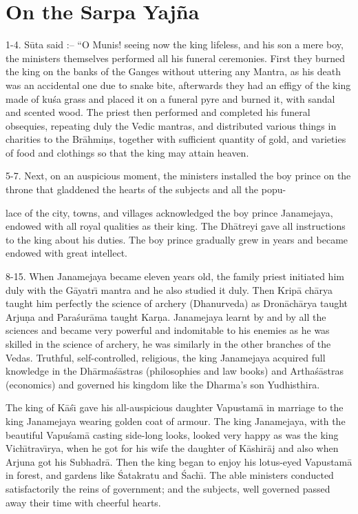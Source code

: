 \chapter{On the Sarpa Yaj\~na}

1-4. S\=uta said :-- ``O Munis! seeing now the king lifeless, and his son a mere boy, the ministers themselves performed all his funeral ceremonies. First they burned the king on the banks of the Ganges without uttering any Mantra, as his death was an accidental one due to snake bite, afterwards they had an effigy of the king made of ku\'sa grass and placed it on a funeral pyre and burned it, with sandal and scented wood. The priest then performed and completed his funeral obsequies, repeating duly the Vedic mantras, and distributed various things in charities to the Br\=ahmi\d{n}s, together with sufficient quantity of gold, and varieties of food and clothings so that the king may attain heaven.

5-7. Next, on an auspicious moment, the ministers installed the boy prince on the throne that gladdened the hearts of the subjects and all the popu-

lace of the city, towns, and villages acknowledged the boy prince Janamejaya, endowed with all royal qualities as their king. The Dh\=atreyi gave all instructions to the king about his duties. The boy prince gradually grew in years and became endowed with great intellect.

8-15. When Janamejaya became eleven years old, the family priest initiated him duly with the G\=ayatr\={\i} mantra and he also studied it duly. Then Krip\=a ch\=arya taught him perfectly the science of archery (Dhanurveda) as Dron\=ach\=arya taught Arju\d{n}a and Para\'sur\=ama taught Kar\d{n}a. Janamejaya learnt by and by all the sciences and became very powerful and indomitable to his enemies as he was skilled in the science of archery, he was similarly in the other branches of the Vedas. Truthful, self-controlled, religious, the king Janamejaya acquired full knowledge in the Dh\=arma\'s\=astras (philosophies and law books) and Artha\'s\=astras (economics) and governed his kingdom like the Dharma's son Yudhisthira.

The king of K\=a\'s\={\i} gave his all-auspicious daughter Vapustam\=a in marriage to the king Janamejaya wearing golden coat of armour. The king Janamejaya, with the beautiful Vapu\'sam\=a casting side-long looks, looked very happy as was the king Vich\={\i}trav\={\i}rya, when he got for his wife the daughter of K\=ashir\=aj and also when Arjuna got his Subhadr\=a. Then the king began to enjoy his lotus-eyed Vapustam\=a in forest, and gardens like \'Satakratu and \'Sach\={\i}. The able ministers conducted satisfactorily the reins of government; and the subjects, well governed passed away their time with cheerful hearts.

